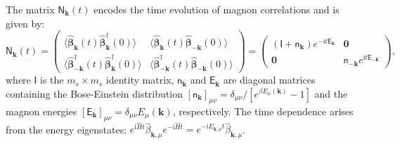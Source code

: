 \documentclass[aps, prx, nofootinbib, superscriptaddress]{revtex4-2}
\newcommand{\kvec}{\mathbf{k}}
\newcommand{\ri}{\mathrm{i}}
\begin{document}
The matrix $\mathsf{N}_{\kvec}(t)$ encodes the time evolution of magnon correlations and is given by:
\begin{equation}
    \mathsf{N}_{\kvec}(t) 
    = 
    \begin{pmatrix}
        \langle \hat{\boldsymbol{\beta}}_{\kvec}(t) \hat{\boldsymbol{\beta}}_{\kvec}^{\dagger}(0) \rangle & \langle \hat{\boldsymbol{\beta}}_{\kvec}(t) \hat{\boldsymbol{\beta}}_{-\kvec}(0) \rangle \\
        \langle \hat{\boldsymbol{\beta}}_{-\kvec}^{\dagger}(t) \hat{\boldsymbol{\beta}}_{\kvec}^{\dagger}(0) \rangle & \langle \hat{\boldsymbol{\beta}}_{-\kvec}^{\dagger}(t) \hat{\boldsymbol{\beta}}_{-\kvec}(0) \rangle
    \end{pmatrix}
    = 
    \begin{pmatrix}
        (\mathsf{I} + \mathsf{n}_{\kvec})e^{-\ri t\mathsf{E}_{\kvec}} & \mathbf{0} \\
        \mathbf{0} & \mathsf{n}_{-\kvec}e^{\ri t\mathsf{E}_{-\kvec}}
    \end{pmatrix},
\end{equation}
where $\mathsf{I}$ is the $m_s \times m_s$ identity matrix, $\mathsf{n}_{\kvec}$ and $\mathsf{E}_{\kvec}$ are diagonal matrices containing the Bose-Einstein distribution $[\mathsf{n}_{\kvec}]_{\mu\nu} = \delta_{\mu\nu}/[e^{\beta E_\mu(\kvec)} - 1]$ and the magnon energies $[\mathsf{E}_{\kvec}]_{\mu\nu} = \delta_{\mu\nu}E_{\mu}(\kvec)$, respectively. The time dependence arises from the energy eigenstates: $e^{\ri\hat{H}t}\hat{\beta}_{\kvec,\mu}e^{-\ri\hat{H}t} = e^{-\ri E_{\kvec,\mu}t}\hat{\beta}_{\kvec,\mu}$.
\end{document}
